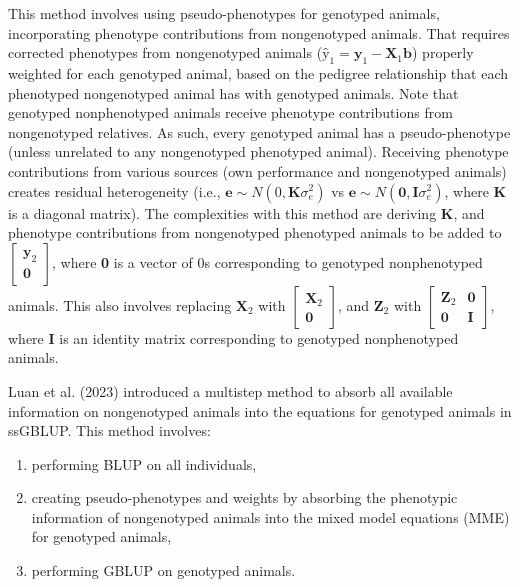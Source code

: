 \documentclass[authordate, empirical]{jote-new-article}
\begin{document}
	This method involves using pseudo-phenotypes for genotyped animals, incorporating phenotype contributions from nongenotyped animals. That requires corrected phenotypes from nongenotyped animals ($\textbf{\^{y}}_1=\textbf{y}_1-\textbf{X}_1 \textbf{\^{b}}$) properly weighted for each genotyped animal, based on the pedigree relationship that each phenotyped nongenotyped animal has with genotyped animals. Note that genotyped nonphenotyped animals receive phenotype contributions from nongenotyped relatives. As such, every genotyped animal has a pseudo-phenotype (unless unrelated to any nongenotyped phenotyped animal). Receiving phenotype contributions from various sources (own performance and nongenotyped animals) creates residual heterogeneity (i.e., $\textbf{e}\sim N(0,\textbf{K}\sigma_e^2 )$ vs $\textbf{e}\sim N(\textbf{0},\textbf{I}\sigma_e^2 )$, where \textbf{K} is a diagonal matrix). The complexities with this method are deriving \textbf{K}, and phenotype contributions from nongenotyped phenotyped animals to be added to $\begin{bmatrix}
\textbf{y}_2\\
\textbf{0}
\end{bmatrix}$, where \textbf{0} is a vector of 0s corresponding to genotyped nonphenotyped animals. This also involves replacing $\textbf{X}_2$ with $\begin{bmatrix}\textbf{X}_2\\\textbf{0}\end{bmatrix}$, and $\textbf{Z}_2$ with $\begin{bmatrix}\textbf{Z}_2&\textbf{0}\\\textbf{0}&\textbf{I}\end{bmatrix}$, where \textbf{I} is an identity matrix corresponding to genotyped nonphenotyped animals.



	Luan et al. (2023) introduced a multistep method to absorb all available information on nongenotyped animals into the equations for genotyped animals in ssGBLUP. This method involves:

	\begin{enumerate}


		\item performing BLUP on all individuals,



		\item
		creating pseudo-phenotypes and weights by absorbing the phenotypic information of nongenotyped animals into the mixed model equations (MME) for genotyped animals,



		\item performing GBLUP on genotyped animals.


	\end{enumerate}
\end{document}
